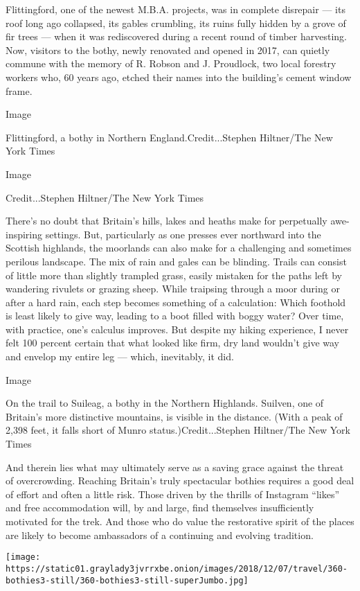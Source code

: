 Flittingford, one of the newest M.B.A. projects, was in complete
disrepair --- its roof long ago collapsed, its gables crumbling, its
ruins fully hidden by a grove of fir trees --- when it was rediscovered
during a recent round of timber harvesting. Now, visitors to the bothy,
newly renovated and opened in 2017, can quietly commune with the memory
of R. Robson and J. Proudlock, two local forestry workers who, 60 years
ago, etched their names into the building's cement window frame.

Image

Flittingford, a bothy in Northern England.Credit...Stephen Hiltner/The
New York Times

Image

Credit...Stephen Hiltner/The New York Times

There's no doubt that Britain's hills, lakes and heaths make for
perpetually awe-inspiring settings. But, particularly as one presses
ever northward into the Scottish highlands, the moorlands can also make
for a challenging and sometimes perilous landscape. The mix of rain and
gales can be blinding. Trails can consist of little more than slightly
trampled grass, easily mistaken for the paths left by wandering rivulets
or grazing sheep. While traipsing through a moor during or after a hard
rain, each step becomes something of a calculation: Which foothold is
least likely to give way, leading to a boot filled with boggy water?
Over time, with practice, one's calculus improves. But despite my hiking
experience, I never felt 100 percent certain that what looked like firm,
dry land wouldn't give way and envelop my entire leg --- which,
inevitably, it did.

Image

On the trail to Suileag, a bothy in the Northern Highlands. Suilven, one
of Britain's more distinctive mountains, is visible in the distance.
(With a peak of 2,398 feet, it falls short of Munro
status.)Credit...Stephen Hiltner/The New York Times

And therein lies what may ultimately serve as a saving grace against the
threat of overcrowding. Reaching Britain's truly spectacular bothies
requires a good deal of effort and often a little risk. Those driven by
the thrills of Instagram ``likes'' and free accommodation will, by and
large, find themselves insufficiently motivated for the trek. And those
who do value the restorative spirit of the places are likely to become
ambassadors of a continuing and evolving tradition.

\texttt{[image: https://static01.graylady3jvrrxbe.onion/images/2018/12/07/travel/360-bothies3-still/360-bothies3-still-superJumbo.jpg]}

